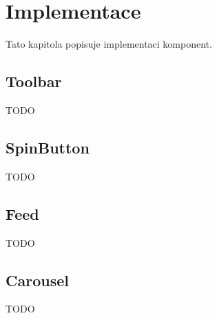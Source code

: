 \chapter{Implementace}

Tato kapitola popisuje implementaci komponent.

\section{Toolbar}

TODO

\section{SpinButton}

TODO

\section{Feed}

TODO

\section{Carousel}

TODO









